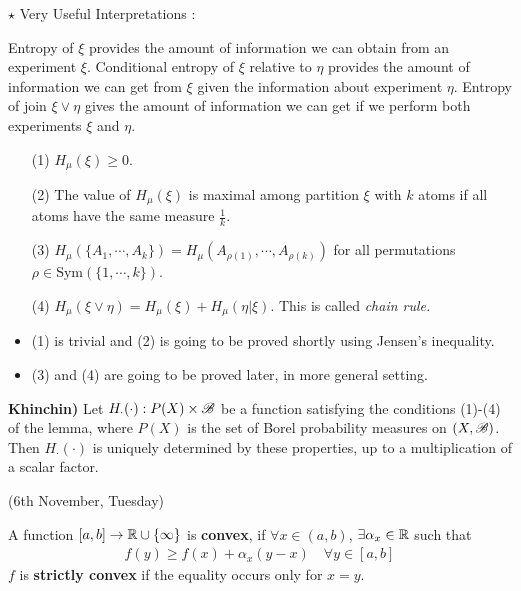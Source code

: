 \documentclass[10pt,a4paper]{report}
\newenvironment{proof}
{\begin{changemargin}{1cm}{0.5cm} 
	}%
	{\end{changemargin}
}
\begin{document}
$\star$ Very Useful Interpretations : 

\quad Entropy of $\xi$ provides the amount of information we can obtain from an experiment $\xi$. Conditional entropy of $\xi$ relative to $\eta$ provides the amount of information we can get from $\xi$ given the information about experiment $\eta$. Entropy of join $\xi \vee \eta$ gives the amount of information we can get if we perform both experiments $\xi$ and $\eta$.
\s

\lem
\begin{itemize}
\item[(1)] $H_{\mu} (\xi) \geq 0$.
\item[(2)] The value of $H_{\mu}(\xi)$ is maximal among partition $\xi$ with $k$ atoms if all atoms have the same measure $\frac{1}{k}$.
\item[(3)] $H_{\mu}(\{A_1, \cdots, A_k \}) = H_{\mu}(A_{\rho (1)}, \cdots, A_{\rho (k)})$ for all permutations $\rho \in \text{Sym}(\{1,\cdots,k\})$.
\item[(4)] $H_{\mu} (\xi \vee \eta) = H_{\mu}(\xi) + H_{\mu}(\eta |\xi)$. This is called \emph{chain rule.}
\end{itemize}
\begin{proof}
\pf \begin{itemize}
\item (1) is trivial and (2) is going to be proved shortly using Jensen's inequality.
\item (3) and (4) are going to be proved later, in more general setting.
\end{itemize}
\end{proof}
\s

\textbf{Khinchin)} Let $H_{\cdot}(\cdot) : P(X) \times \mathscr{B}$ be a function satisfying the conditions (1)-(4) of the lemma, where $P(X)$ is the set of Borel probability measures on $(X,\mathscr{B})$. Then $H_{\cdot}(\cdot)$ is uniquely determined by these properties, up to a multiplication of a scalar factor.
\s

\newday
\s

(6th November, Tuesday)

 A function $[a,b] \rightarrow \mathbb{R} \cup \{ \infty \}$ is \textbf{convex}, if $\forall x \in (a,b)$, $\exists \alpha_x \in \mathbb{R}$ such that
\begin{align*}
f(y) \geq f(x) + \alpha_x (y-x) \quad \forall y \in [a,b]
\end{align*}
$f$ is \textbf{strictly convex} if the equality occurs only for $x=y$. 
\s
\end{document}
